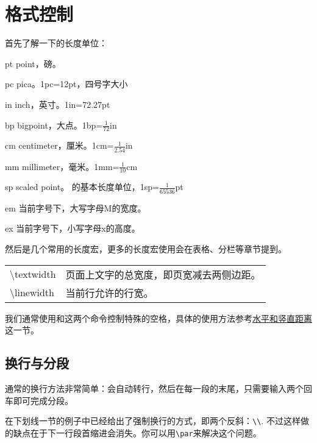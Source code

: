 {\section{格式控制}
首先了解一下的长度单位：
\begin{fead}
  \item[pt] point，磅。\label{sec:length}
  \item[pc] pica。1pc=12pt，四号字大小
  \item[in] inch，英寸。1in=72.27pt
  \item[bp] bigpoint，大点。1bp=$\frac{1}{72}$in
  \item[cm] centimeter，厘米。1cm=$\frac{1}{2.54}$in
  \item[mm] millimeter，毫米。1mm=$\frac{1}{10}$cm
  \item[sp] scaled point。 的基本长度单位，1sp=$\frac{1}{65536}$pt
  \item[em] 当前字号下，大写字母M的宽度。
  \item[ex] 当前字号下，小写字母x的高度。
\end{fead}

然后是几个常用的长度宏，更多的长度宏使用会在表格、分栏等章节提到。

\begin{center}
\begin{tabular}{|ll|}
\hline
\textbackslash{}textwidth & 页面上文字的总宽度，即页宽减去两侧边距。\\
\textbackslash{}linewidth & 当前行允许的行宽。\\
\hline
\end{tabular}
\end{center}

我们通常使用\latexline{\\hspace{len}}和\latexline{\\vspace{len}}这两个命令控制特殊的空格，具体的使用方法参考\hyperref[sec:hvspace]{水平和竖直距离}这一节。

\subsection{换行与分段}
通常的换行方法非常简单：会自动转行，然后在每一段的末尾，只需要输入两个回车即可完成分段。

在下划线一节的例子中已经给出了强制换行的方式，即两个反斜：\verb|\\|. 不过这样做的缺点在于下一行段首缩进会消失。你可以用\verb|\par|来解决这个问题。

}
